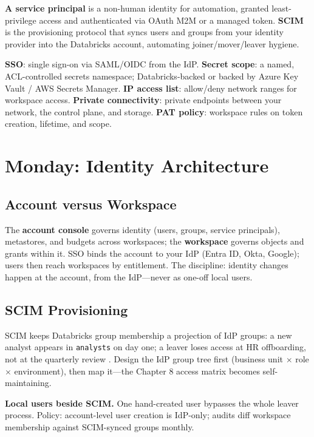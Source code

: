 \begin{definitionbox}
\textbf{A service principal} is a non-human identity for automation, granted least-privilege access and authenticated via OAuth M2M or a managed token. \textbf{SCIM} is the provisioning protocol that syncs users and groups from your identity provider into the Databricks account, automating joiner/mover/leaver hygiene.
\end{definitionbox}

\begin{keyterms}
\textbf{SSO}: single sign-on via SAML/OIDC from the IdP. \textbf{Secret scope}: a named, ACL-controlled secrets namespace; Databricks-backed or backed by Azure Key Vault / AWS Secrets Manager. \textbf{IP access list}: allow/deny network ranges for workspace access. \textbf{Private connectivity}: private endpoints between your network, the control plane, and storage. \textbf{PAT policy}: workspace rules on token creation, lifetime, and scope.
\end{keyterms}

\section{Monday: Identity Architecture}
\subsection{Account versus Workspace}
The \textbf{account console} governs identity (users, groups, service principals), metastores, and budgets across workspaces; the \textbf{workspace} governs objects and grants within it. SSO binds the account to your IdP (Entra ID, Okta, Google); users then reach workspaces by entitlement. The discipline: identity changes happen at the account, from the IdP---never as one-off local users.

\subsection{SCIM Provisioning}
SCIM keeps Databricks group membership a projection of IdP groups: a new analyst appears in \texttt{analysts} on day one; a leaver loses access at HR offboarding, not at the quarterly review \cite{databricksSCIM}. Design the IdP group tree first (business unit $\times$ role $\times$ environment), then map it---the Chapter 8 access matrix becomes self-maintaining.

\begin{pitfall}
\textbf{Local users beside SCIM.} One hand-created user bypasses the whole leaver process. Policy: account-level user creation is IdP-only; audits diff workspace membership against SCIM-synced groups monthly.
\end{pitfall}

